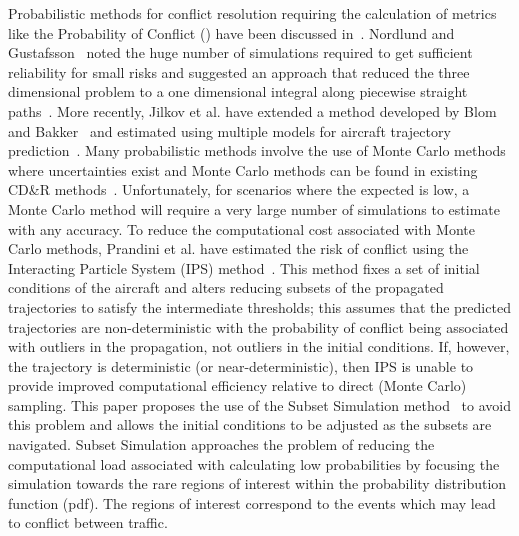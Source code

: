 \documentclass[journal]{IEEEtran}
\begin{document}
Probabilistic methods for conflict resolution requiring the calculation of metrics like the Probability of Conflict () have been discussed in~\cite{kuchar2000review}. Nordlund and Gustafsson~\cite{Nordlund2011} noted the huge number of simulations required to get sufficient reliability for small risks and suggested an approach that reduced the three dimensional problem to a one dimensional integral along piecewise straight paths~\cite{nordlund2008probabilistic,Lindsten200965}.
More recently, Jilkov et al. have extended a method developed by Blom and Bakker~\cite{blom2002conflict} and estimated  using multiple models for aircraft trajectory prediction~\cite{jilkov2014improved}. Many probabilistic methods involve the use of Monte Carlo methods where uncertainties exist and Monte Carlo methods can be found in existing CD\&R methods~\cite{jilkov2014improved,chryssanthacopoulos2011accounting,wolf2011aircraft,belkhouche2013modeling,blom2006free,Watkins2003Stochastic,prandini2000probabilistic,Krozel1997Decision}. Unfortunately, for scenarios where the expected  is low, a Monte Carlo method will require a very large number of simulations to estimate  with any accuracy. To reduce the computational cost associated with Monte Carlo methods, Prandini et al. have estimated the risk of conflict using the Interacting Particle System (IPS) method~\cite{prandini2011air}. This method fixes a set of initial conditions of the aircraft and alters reducing subsets of the propagated trajectories to satisfy the intermediate thresholds; this assumes that the predicted trajectories are non-deterministic with the probability of conflict being associated with outliers in the propagation, not outliers in the initial conditions. If, however, the trajectory is deterministic (or near-deterministic), then IPS is unable to provide improved computational efficiency relative to direct (Monte Carlo) sampling. This paper proposes the use of the Subset Simulation method~\cite{au2001estimation} to avoid this problem and allows the initial conditions to be adjusted as the subsets are navigated. Subset Simulation approaches the problem of reducing the computational load associated with calculating low probabilities by focusing the simulation towards the rare regions of interest within the probability distribution function (pdf). The regions of interest correspond to the events which may lead to conflict between traffic. 
\end{document}
